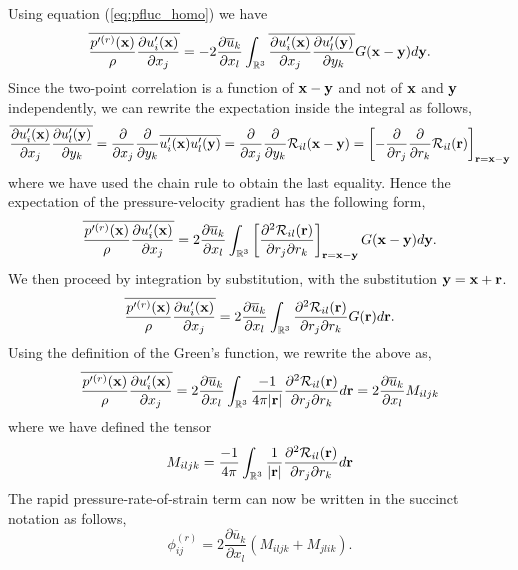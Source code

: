 \documentclass[oneside,a4paper,11pt]{report}
\newcommand{\uavg}{\overline{u}}
\newcommand{\pfluc}{p'}
\newcommand{\ufluc}{u'}
\newcommand{\tpvc}{\mathcal{R}} %
\newcommand{\redi}{\phi}        %
\begin{document}
Using equation (\ref{eq:pfluc_homo}) we have
\begin{equation}
\overline{ \frac{\pfluc^{(r)}(\xvec)}{\rho} \frac{\partial \ufluc_i(\xvec)}{\partial x_j} }= -2\frac{\partial \uavg_k}{\partial x_l} \int_\Rthree \overline{ \frac{\partial \ufluc_i(\xvec)}{\partial x_j} \frac{\partial \ufluc_l(\yvec)}{\partial y_k} } G(\xvec-\yvec) d\yvec.
\end{equation}
Since the two-point correlation is a function of $\mathbf{x} - \mathbf{y}$ and not of $\mathbf{x}$ and $\mathbf{y}$ independently, we can rewrite the expectation inside the integral as follows,
\begin{equation}
\overline{ \frac{\partial \ufluc_i(\xvec)}{\partial x_j} \frac{\partial \ufluc_l(\yvec)}{\partial y_k} } = \frac{\partial}{\partial x_j} \frac{\partial}{\partial y_k} \overline{ \ufluc_i(\xvec) \ufluc_l(\yvec) } = \frac{\partial}{\partial x_j} \frac{\partial}{\partial y_k} \tpvc_{il}(\xvec - \yvec) = \left [-\frac{\partial}{\partial r_j} \frac{\partial}{\partial r_k} \tpvc_{il}(\rvec) \right]_{\rvec = \xvec-\yvec}
\end{equation}
where we have used the chain rule to obtain the last equality.
Hence the expectation of the pressure-velocity gradient has the following form,
\begin{equation}
\overline{ \frac{\pfluc^{(r)}(\xvec)}{\rho} \frac{\partial \ufluc_i(\xvec)}{\partial x_j} }= 2\frac{\partial \uavg_k}{\partial x_l} \int_\Rthree \left [\frac{\partial^2 \tpvc_{il}(\rvec)}{\partial r_j \partial r_k} \right]_{\rvec = \xvec-\yvec} G(\xvec-\yvec) d\yvec.
\end{equation}
We then proceed by integration by substitution, with the substitution $\mathbf{y} = \mathbf{x} + \mathbf{r}$.
\begin{equation}
\overline{ \frac{\pfluc^{(r)}(\xvec)}{\rho} \frac{\partial \ufluc_i(\xvec)}{\partial x_j} } = 2\frac{\partial \uavg_k}{\partial x_l} \int_\Rthree\frac{\partial^2 \tpvc_{il}(\rvec)}{\partial r_j \partial r_k} G(\rvec) d\rvec.
\end{equation}
Using the definition of the Green's function, we rewrite the above as,
\begin{equation}
\overline{ \frac{\pfluc^{(r)}(\xvec)}{\rho} \frac{\partial \ufluc_i(\xvec)}{\partial x_j} } = 2 \frac{\partial \uavg_k}{\partial x_l} \int_\Rthree \frac{-1}{4 \pi |\rvec|} \frac{\partial^2 \tpvc_{il}(\rvec)}{\partial r_j \partial r_k} d\rvec = 2 \frac{\partial \uavg_k}{\partial x_l} M_{iljk}
\end{equation}
where we have defined the tensor 
\begin{equation}
M_{iljk} = \frac{-1}{4\pi}\int_\Rthree \frac{1}{|\rvec|} \frac{\partial^2 \tpvc_{il}(\rvec)}{\partial r_j \partial r_k} d\rvec 
\end{equation}
The rapid pressure-rate-of-strain term can now be written in the succinct notation as follows,
\begin{equation}
\redi^{(r)}_{ij} = 2\frac{\partial \uavg_k}{\partial x_l} (M_{iljk} + M_{jlik}).
\end{equation}
\end{document}
